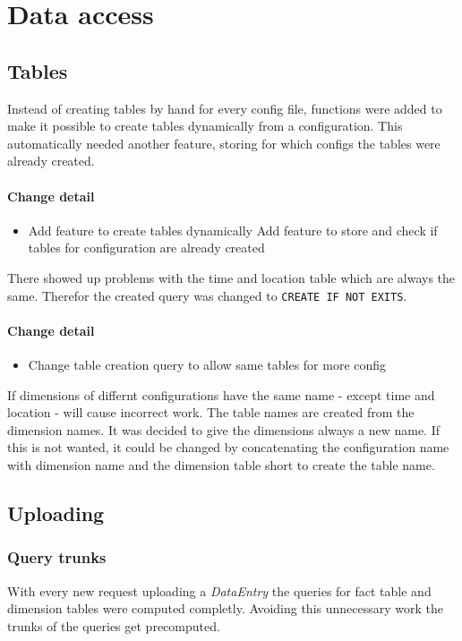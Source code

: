 \section{Data access}

\subsection{Tables}
Instead of creating tables by hand for every config file, functions
were added to make it possible to create tables dynamically from
a configuration. This automatically needed another feature,
storing for which configs the tables were already created.

\paragraph{Change detail}
\begin{itemize}
  \item Add feature to create tables dynamically
  \itme Add feature to store and check if tables for configuration are already created
\end{itemize}

There showed up problems with the time and location table
which are always the same. Therefor the created query
was changed to \texttt{CREATE IF NOT EXITS}.

\paragraph{Change detail}
\begin{itemize}
  \item Change table creation query to allow same tables for more config
\end{itemize}

If dimensions of differnt configurations have the same name - except time and location -
will cause incorrect work. The table names are created from the dimension names.
It was decided to give the dimensions always a new name. If this is
not wanted, it could be changed by concatenating
the configuration name with dimension name and the dimension table short
to create the table name.

\subsection{Uploading}
\subsubsection{Query trunks}
With every new request uploading a \textit{DataEntry} the queries 
for fact table and dimension tables were computed completly. Avoiding
this unnecessary work the trunks of the queries get precomputed.

